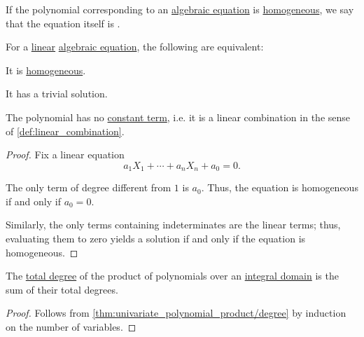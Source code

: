 \begin{definition}\label{def:homogeneous_equation}\mimprovised
  If the polynomial corresponding to an \hyperref[def:polynomial_equation]{algebraic equation} is \hyperref[def:homogeneous_polynomial]{homogeneous}, we say that the equation itself is .
\end{definition}

\begin{proposition}\label{thm:homogeneous_linear_equation}
  For a \hyperref[tab:def:polynomial_degree]{linear} \hyperref[def:polynomial_equation]{algebraic equation}, the following are equivalent:
  \begin{thmenum}
     It is \hyperref[def:homogeneous_equation]{homogeneous}.

     It has a trivial solution.

     The polynomial has no \hyperref[def:univariate_polynomial]{constant term}, i.e. it is a linear combination in the sense of \cref{def:linear_combination}.
  \end{thmenum}
\end{proposition}
\begin{proof}
  Fix a linear equation
  \begin{equation*}
    a_1 X_1 + \cdots + a_n X_n + a_0 = 0.
  \end{equation*}

  The only term of degree different from \( 1 \) is \( a_0 \). Thus, the equation is homogeneous if and only if \( a_0 = 0 \).

  Similarly, the only terms containing indeterminates are the linear terms; thus, evaluating them to zero yields a solution if and only if the equation is homogeneous.
\end{proof}

\begin{proposition}\label{thm:degree_of_multivariate_polynomial_product}
  The \hyperref[def:polynomial_degree]{total degree} of the product of polynomials over an \hyperref[def:integral_domain]{integral domain} is the sum of their total degrees.
\end{proposition}
\begin{proof}
  Follows from \cref{thm:univariate_polynomial_product/degree} by induction on the number of variables.
\end{proof}

